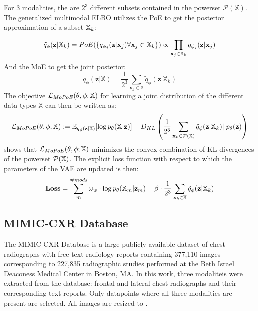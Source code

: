 For 3 modalities, the are $2^3$ different subsets contained in the powerset $\mathcal{P}(\mathbb{X})$. %
The generalized multimodal ELBO utilizes the PoE to get the posterior approximation of a subset $\mathbb{X}_k$:

\begin{equation}
    \tilde{q}_{\phi}(\textbf{z}|\mathbb{X}_k)=PoE(\{q_{\phi_j}(\textbf{z}|\textbf{x}_j) \forall \textbf{x}_j \in \mathbb{X}_k\}) \propto \prod _{\textbf{x}_j \in \mathbb{X}_k}q_{\phi_j}(\textbf{z}|\textbf{x}_j)
\end{equation}
And the MoE to get the joint posterior:
\begin{equation}
    q_{\phi}(\textbf{z}|\mathbb{X}) = \frac{1}{2^3} \sum _{\textbf{x}_k \in \mathbb{X}} \tilde{q}_{\phi} (\textbf{z}|\mathbb{X}_k)
\end{equation}
The objective $\mathcal{L}_{MoPoE}(\theta, \phi; \mathbb{X})$ for learning a joint distribution of the different data types $\mathbb{X}$ can then be written as:
\begin{equation}
    \mathcal{L}_{MoPoE}(\theta, \phi; \mathbb{X}) := \mathbb{E}_{q_{\phi}(\textbf{z}|\mathbb{X})}[\log p_{\theta}(\mathbb{X}|\textbf{z})] - D_{KL} \left( \frac{1}{2^3} \sum _{\textbf{x}_k \in \mathcal{P}(\mathbb{X})} \tilde{q}_{\phi} (\textbf{z}|\mathbb{X}_k)||p_{\theta}(\textbf{z})\right)
\end{equation}
\cite{thomas_gener-ELBO} shows that $\mathcal{L}_{MoPoE}(\theta, \phi; \mathbb{X})$ minimizes the convex combination of KL-divergences of the powerset $\mathcal{P}(\mathbb{X})$.
The explicit loss function with respect to which the parameters of the VAE are updated is then:
\begin{equation}
    \textbf{Loss} = \sum _m ^{\#mods} \omega _w \cdot \log p_{\theta}(\mathbb{X}_m|\textbf{z}_m) + \beta \cdot \frac{1}{2^3} \sum _{\textbf{x}_k \in \mathbb{X}} \tilde{q}_{\phi}(\textbf{z}|\mathbb{X}_k)
\end{equation}

\subsection{MIMIC-CXR Database}
The MIMIC-CXR Database \cite{johnson2019mimic} is a large publicly available dataset of chest radiographs with free-text radiology reports containing 377,110 images corresponding to 227,835 radiographic studies performed at the Beth Israel Deaconess Medical Center in Boston, MA.
In this work, three modaliteis were extracted from the database: frontal and lateral chest radiographs and their corresponding text reports. Only datapoints where all three modalities are present are selected.
All images are resized to \imgsize.

